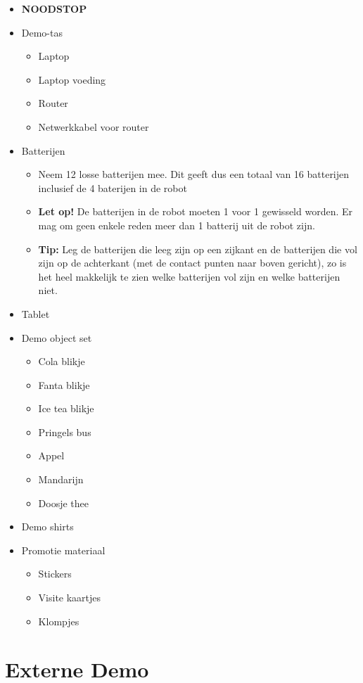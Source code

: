 \documentclass[a4paper,10pt]{article}
\numberwithin{equation}{section}
\numberwithin{figure}{section}
\numberwithin{table}{section}
\begin{document}
\begin{itemize}
	\item \textbf{NOODSTOP}
	\item Demo-tas
	\begin{itemize}
		\item Laptop
		\item Laptop voeding
		\item Router
		\item Netwerkkabel voor router
	\end{itemize}
	\item Batterijen
	\begin{itemize}
		\item Neem 12 losse batterijen mee. Dit geeft dus een totaal van 16 batterijen inclusief de 4 baterijen in de robot
		\item \textbf{Let op!} De batterijen in de robot moeten 1 voor 1 gewisseld worden. Er mag om geen enkele reden meer dan 1 batterij uit de robot zijn.
		\item \textbf{Tip:} Leg de batterijen die leeg zijn op een zijkant  en de batterijen die vol zijn op de achterkant (met de contact punten naar boven gericht), zo is het heel makkelijk te zien welke batterijen vol zijn en welke batterijen niet.
	\end{itemize}
	\item Tablet
	    \item Demo object set
	    \begin{itemize}
	    	\item Cola blikje
	    	\item Fanta blikje
	    	\item Ice tea blikje
	    	\item Pringels bus
	    	\item Appel
	    	\item Mandarijn
	    	\item Doosje thee
	    \end{itemize}
	\item Demo shirts
	\item Promotie materiaal
		\begin{itemize}
			\item Stickers
			\item Visite kaartjes
			\item Klompjes
		\end{itemize}
\end{itemize}

\section{Externe Demo}
\end{document}
